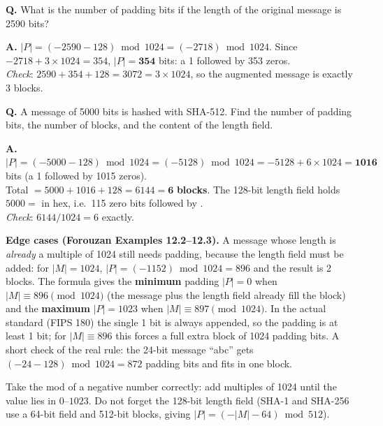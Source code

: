 \begin{worked}
\textbf{Q.} What is the number of padding bits if the length of the original message is 2590 bits?

\textbf{A.} $|P| = (-2590 - 128) \bmod 1024 = (-2718) \bmod 1024$. Since $-2718 + 3 \times 1024 = 354$, $|P| = \mathbf{354}$ bits: a 1 followed by 353 zeros.\\
\emph{Check}: $2590 + 354 + 128 = 3072 = 3 \times 1024$, so the augmented message is exactly 3 blocks.
\end{worked}

\begin{worked}
\textbf{Q.} A message of 5000 bits is hashed with SHA-512. Find the number of padding bits, the number of blocks, and the content of the length field.

\textbf{A.} $|P| = (-5000 - 128) \bmod 1024 = (-5128) \bmod 1024 = -5128 + 6 \times 1024 = \mathbf{1016}$ bits (a 1 followed by 1015 zeros).\\
Total $= 5000 + 1016 + 128 = 6144 = \mathbf{6}$ \textbf{blocks}. The 128-bit length field holds $5000 = $  in hex, i.e.\ 115 zero bits followed by .\\
\emph{Check}: $6144 / 1024 = 6$ exactly.
\end{worked}

\textbf{Edge cases (Forouzan Examples 12.2--12.3).} A message whose length is \emph{already} a multiple of 1024 still needs padding, because the length field must be added: for $|M| = 1024$, $|P| = (-1152) \bmod 1024 = 896$ and the result is 2 blocks. The formula gives the \textbf{minimum} padding $|P| = 0$ when $|M| \equiv 896 \pmod{1024}$ (the message plus the length field already fill the block) and the \textbf{maximum} $|P| = 1023$ when $|M| \equiv 897 \pmod{1024}$. In the actual standard (FIPS 180) the single 1 bit is always appended, so the padding is at least 1 bit; for $|M| \equiv 896$ this forces a full extra block of 1024 padding bits. A short check of the real rule: the 24-bit message ``abc'' gets $(-24 - 128) \bmod 1024 = 872$ padding bits and fits in one block.

\begin{trap}
Take the mod of a negative number correctly: add multiples of 1024 until the value lies in $0$--$1023$. Do not forget the 128-bit length field (SHA-1 and SHA-256 use a 64-bit field and 512-bit blocks, giving $|P| = (-|M| - 64) \bmod 512$).
\end{trap}

